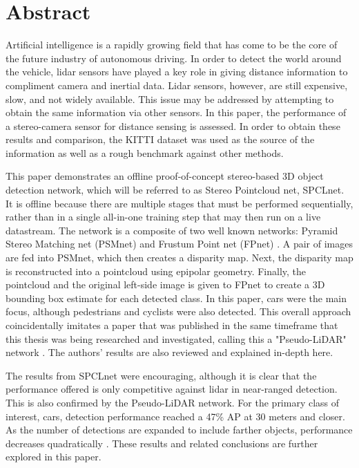 \section*{Abstract} %

Artificial intelligence is a rapidly growing field that has come to be the core of the future industry of autonomous driving. In order to detect the world around the vehicle, lidar sensors have played a key role in giving distance information to compliment camera and inertial data. Lidar sensors, however, are still expensive, slow, and not widely available. This issue may be addressed by attempting to obtain the same information via other sensors. In this paper, the performance of a stereo-camera sensor for distance sensing is assessed. In order to obtain these results and comparison, the KITTI dataset was used as the source of the information as well as a rough benchmark against other methods. 

This paper demonstrates an offline proof-of-concept stereo-based 3D object detection network, which will be referred to as Stereo Pointcloud net, SPCLnet. It is offline because there are multiple stages that must be performed sequentially, rather than in a single all-in-one training step that may then run on a live datastream. The network is a composite of two well known networks: Pyramid Stereo Matching net (PSMnet) \cite{chang_pyramid_2018} and Frustum Point net (FPnet) \cite{qi_frustum_2017}. A pair of images are fed into PSMnet, which then creates a disparity map. Next, the disparity map is reconstructed into a pointcloud using epipolar geometry. Finally, the pointcloud and the original left-side image is given to FPnet to create a 3D bounding box estimate for each detected class. In this paper, cars were the main focus, although pedestrians and cyclists were also detected. This overall approach coincidentally imitates a paper that was published in the same timeframe that this thesis was being researched and investigated, calling this a "Pseudo-LiDAR" network \cite{wang_pseudo-lidar_2019}. The authors' results are also reviewed and explained in-depth here.

The results from SPCLnet were encouraging, although it is clear that the performance offered is only competitive against lidar in near-ranged detection. This is also confirmed by the Pseudo-LiDAR network. For the primary class of interest, cars, detection performance reached a 47\% AP at 30 meters and closer. As the number of detections are expanded to include farther objects, performance decreases quadratically \cite{wang_pseudo-lidar_2019}. These results and related conclusions are further explored in this paper.

